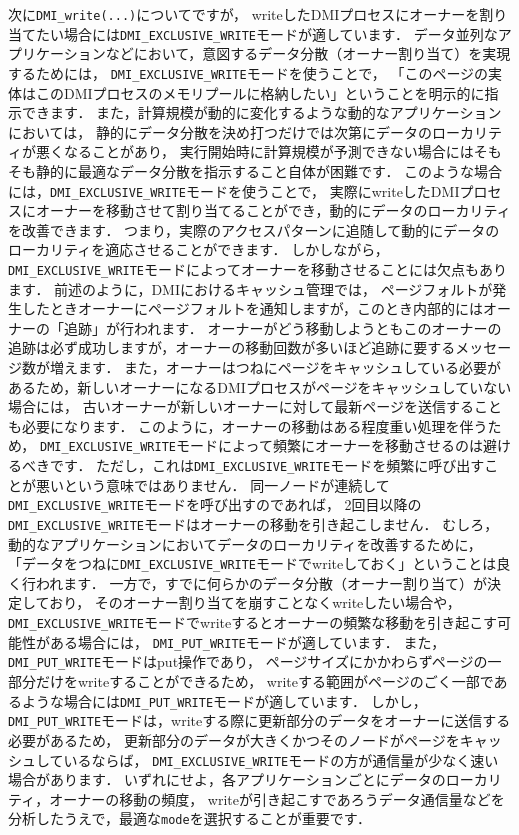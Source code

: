 \documentclass[report,12pt]{jsbook}
\begin{document}
次に\texttt{DMI\_write(...)}についてですが，
writeしたDMIプロセスにオーナーを割り当てたい場合には\texttt{DMI\_EXCLUSIVE\_WRITE}モードが適しています．
データ並列なアプリケーションなどにおいて，意図するデータ分散（オーナー割り当て）を実現するためには，
\texttt{DMI\_EXCLUSIVE\_WRITE}モードを使うことで，
「このページの実体はこのDMIプロセスのメモリプールに格納したい」ということを明示的に指示できます．
また，計算規模が動的に変化するような動的なアプリケーションにおいては，
静的にデータ分散を決め打つだけでは次第にデータのローカリティが悪くなることがあり，
実行開始時に計算規模が予測できない場合にはそもそも静的に最適なデータ分散を指示すること自体が困難です．
このような場合には，\texttt{DMI\_EXCLUSIVE\_WRITE}モードを使うことで，
実際にwriteしたDMIプロセスにオーナーを移動させて割り当てることができ，動的にデータのローカリティを改善できます．
つまり，実際のアクセスパターンに追随して動的にデータのローカリティを適応させることができます．
しかしながら，\texttt{DMI\_EXCLUSIVE\_WRITE}モードによってオーナーを移動させることには欠点もあります．
前述のように，DMIにおけるキャッシュ管理では，
ページフォルトが発生したときオーナーにページフォルトを通知しますが，このとき内部的にはオーナーの「追跡」が行われます．
オーナーがどう移動しようともこのオーナーの追跡は必ず成功しますが，オーナーの移動回数が多いほど追跡に要するメッセージ数が増えます．
また，オーナーはつねにページをキャッシュしている必要があるため，新しいオーナーになるDMIプロセスがページをキャッシュしていない場合には，
古いオーナーが新しいオーナーに対して最新ページを送信することも必要になります．
このように，オーナーの移動はある程度重い処理を伴うため，
\texttt{DMI\_EXCLUSIVE\_WRITE}モードによって頻繁にオーナーを移動させるのは避けるべきです．
ただし，これは\texttt{DMI\_EXCLUSIVE\_WRITE}モードを頻繁に呼び出すことが悪いという意味ではありません．
同一ノードが連続して\texttt{DMI\_EXCLUSIVE\_WRITE}モードを呼び出すのであれば，
2回目以降の\texttt{DMI\_EXCLUSIVE\_WRITE}モードはオーナーの移動を引き起こしません．
むしろ，動的なアプリケーションにおいてデータのローカリティを改善するために，
「データをつねに\texttt{DMI\_EXCLUSIVE\_WRITE}モードでwriteしておく」ということは良く行われます．
一方で，すでに何らかのデータ分散（オーナー割り当て）が決定しており，
そのオーナー割り当てを崩すことなくwriteしたい場合や，
\texttt{DMI\_EXCLUSIVE\_WRITE}モードでwriteするとオーナーの頻繁な移動を引き起こす可能性がある場合には，
\texttt{DMI\_PUT\_WRITE}モードが適しています．
また，\texttt{DMI\_PUT\_WRITE}モードはput操作であり，
ページサイズにかかわらずページの一部分だけをwriteすることができるため，
writeする範囲がページのごく一部であるような場合には\texttt{DMI\_PUT\_WRITE}モードが適しています．
しかし，\texttt{DMI\_PUT\_WRITE}モードは，writeする際に更新部分のデータをオーナーに送信する必要があるため，
更新部分のデータが大きくかつそのノードがページをキャッシュしているならば，
\texttt{DMI\_EXCLUSIVE\_WRITE}モードの方が通信量が少なく速い場合があります．
いずれにせよ，各アプリケーションごとにデータのローカリティ，オーナーの移動の頻度，
writeが引き起こすであろうデータ通信量などを分析したうえで，最適な\texttt{mode}を選択することが重要です．
\end{document}
